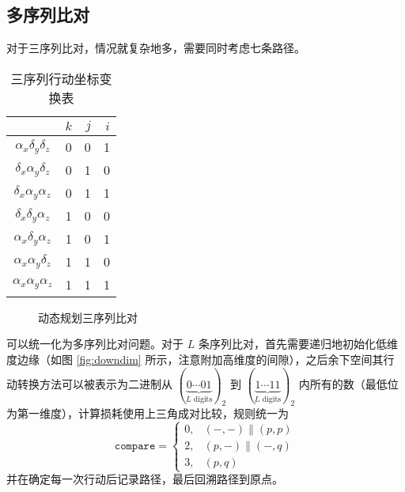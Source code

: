     \subsection{多序列比对}

    对于三序列比对，情况就复杂地多，需要同时考虑七条路径。

    \begin{minipage}{0.48\textwidth}
        \begin{table}[H]
            \centering
            \caption{三序列行动坐标变换表}\label{tab:multiple}
            \begin{tabular}{crrr}
                \toprule
                    & $k$ & $j$ & $i$ \\
                \midrule
                $\alpha_x\delta_y\delta_z$  & 0 & 0 & 1\\
                $\delta_x\alpha_y\delta_z$ & 0 & 1 & 0 \\
                $\delta_x\alpha_y\alpha_z$ & 0 & 1 & 1 \\
                $\delta_x\delta_y\alpha_z$ & 1 & 0 & 0 \\
                $\alpha_x\delta_y\alpha_z$ & 1 & 0 & 1 \\
                $\alpha_x\alpha_y\delta_z$ & 1 & 1 & 0 \\
                $\alpha_x\alpha_y\alpha_z$ & 1 & 1 & 1 \\
                \bottomrule
            \end{tabular}
        \end{table}
    \end{minipage}\hfil
    \begin{minipage}{0.48\textwidth}
        \begin{figure}[H]
            \centering
            
            \caption{动态规划三序列比对}\label{fig:multipledp}
        \end{figure}
    \end{minipage}
    \medskip

    可以统一化为多序列比对问题。对于 $L$ 条序列比对，首先需要递归地初始化低维度边缘（如图 \ref{fig:downdim} 所示，注意附加高维度的间隙），之后余下空间其行动转换方法可以被表示为二进制从 $(\underbrace{0\cdots01}_{L\text{ digits}})_2$ 到 $(\underbrace{1\cdots11}_{L\text{ digits}})_2$ 内所有的数（最低位为第一维度），计算损耗使用上三角成对比较，规则统一为
    \begin{equation*}
        \texttt{compare}=
        \begin{cases}
            0,& (-,-) \| (p,p) \\
            2,& (p,-) \| (-,q) \\
            3,& (p,q)
        \end{cases}
    \end{equation*}
    并在确定每一次行动后记录路径，最后回溯路径到原点。

